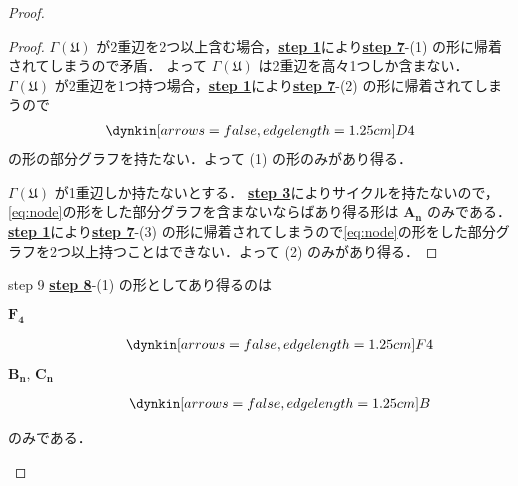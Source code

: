 \documentclass[rep_main]{subfiles}
\begin{document}
\begin{proof}
\begin{proof}
		$\Gamma(\mathfrak{U})$ が2重辺を2つ以上含む場合，\hyperref[lem:classification-step-1]{\textsf{\textbf{step 1}}}により\hyperref[lem:classification-step-7]{\textsf{\textbf{step 7}}}-(1) の形に帰着されてしまうので矛盾．
		よって $\Gamma(\mathfrak{U})$ は2重辺を高々1つしか含まない．
		$\Gamma(\mathfrak{U})$ が2重辺を1つ持つ場合，\hyperref[lem:classification-step-1]{\textsf{\textbf{step 1}}}により\hyperref[lem:classification-step-7]{\textsf{\textbf{step 7}}}-(2) の形に帰着されてしまうので
		\begin{align}
			\label{eq:node}
			\dynkin[arrows=false,edge length=1.25cm] D{4}
		\end{align}
		の形の部分グラフを持たない．よって (1) の形のみがあり得る．

		$\Gamma (\mathfrak{U})$ が1重辺しか持たないとする．
		\hyperref[lem:classification-step-3]{\textsf{\textbf{step 3}}}によりサイクルを持たないので，\eqref{eq:node}の形をした部分グラフを含まないならばあり得る形は $\bm{A_n}$ のみである．
		\hyperref[lem:classification-step-1]{\textsf{\textbf{step 1}}}により\hyperref[lem:classification-step-7]{\textsf{\textbf{step 7}}}-(3) の形に帰着されてしまうので\eqref{eq:node}の形をした部分グラフを2つ以上持つことはできない．よって (2) のみがあり得る．
	\end{proof}
	
	\begin{mylem}[label=lem:classification-step-9]{step 9}
		\hyperref[lem:classification-step-8]{\textsf{\textbf{step 8}}}-(1) の形としてあり得るのは
		\begin{description}
			\item[\textbf{$\bm{F_4}$}] 
			\begin{align}
				\dynkin[arrows=false,edge length=1.25cm] F4
			\end{align}
			
			\item[\textbf{$\bm{B_n},\, \bm{C_n}$}]
			\begin{align}
				\dynkin[arrows=false,edge length=1.25cm] B{}
			\end{align}
		\end{description}
		のみである．
	\end{mylem}
	

\end{proof}
\end{document}

